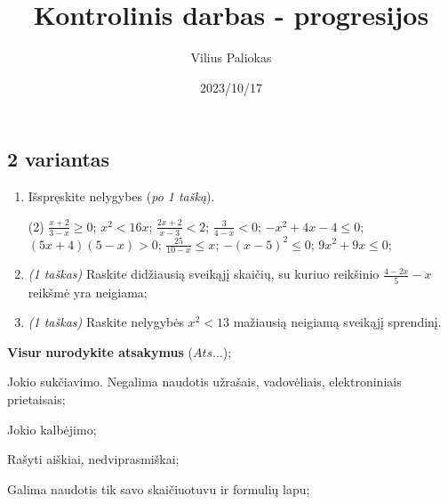 \documentclass[a4paper]{article}
\title{Kontrolinis darbas - progresijos}
\author{Vilius Paliokas}
\date{2023/10/17}
\begin{document}
\thispagestyle{fancy}

\titlespacing*{\subsection}{0pt}{.75ex}{0.75ex}

\subsection*{2 variantas}

\begin{enumerate}
      \item Išspręskite nelygybes (\textit{po 1 tašką}).

            \begin{tasks}[item-format={\normalfont}, after-item-skip=2mm](2)
                  \task $\frac{x+2}{3-x} \geqslant 0$;
                  \task $x^2<16x$;
                  \task $\frac{2x+2}{x-3}<2$;
                  \task $\frac{3}{4-x}<0$;
                  \task $-x^2+4x-4 \leqslant 0$;
                  \task $(5x+4)(5-x)>0$;
                  \task $\frac{25}{10-x} \leqslant x$;
                  \task $-(x-5)^2 \leqslant 0$;
                  \task $9x^2+9x \leq 0$;
            \end{tasks}

      \item \textit{(1 taškas)} Raskite didžiausią sveikąjį skaičių, su kuriuo reikšinio $\frac{4-2x}{5}-x$ reikšmė yra neigiama;
      \item \textit{(1 taškas)} Raskite nelygybės $x^2<13$ mažiausią neigiamą sveikąjį sprendinį.
\end{enumerate}

\begin{small}
      \begin{enumerate*}[label={(\arabic*)}]
            \item \textbf{Visur} \textbf{nurodykite atsakymus} ($Ats\ldots$);
            \item Jokio sukčiavimo. Negalima naudotis užrašais, vadovėliais,
            elektroniniais prietaisais;
            \item Jokio kalbėjimo;
            \item Rašyti aiškiai, nedviprasmiškai;
            \item Galima naudotis tik savo skaičiuotuvu ir formulių lapu;
      \end{enumerate*}
\end{small}
\end{document}
